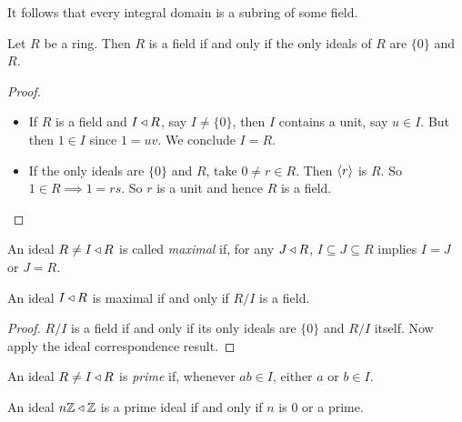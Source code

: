 \documentclass{../template/note}
\begin{document}
    
    \begin{remark*}
        It follows that every integral domain is a subring of some field.
    \end{remark*}


    \begin{proposition}
        Let $R$ be a ring. Then $R$ is a field if and only if the only ideals of $R$ are $\{0\}$ and $R$.
    \end{proposition}
    
    \begin{proof}
        \begin{itemize}
            \item[$\implies$] If $R$ is a field and $I \triangleleft R$, say $I \neq \{0\}$, then $I$ contains a unit, say $u \in I$. But then $1 \in I$ since $1 = uv$. We conclude $I = R$.
            \item[$\impliedby$] If the only ideals are $\{0\}$ and $R$, take $0 \neq r \in R$. Then $\left \langle r \right \rangle$ is $R$. So $1 \in R \implies 1 = rs$. So $r$ is a unit and hence $R$ is a field. 
        \end{itemize}
    \end{proof}
    
    \begin{definition}
        An ideal $R \neq I \triangleleft R$ is called \emph{maximal} if, for any $J \triangleleft R$, $I \subseteq J \subseteq R$ implies $I = J$ or $J = R$.
    \end{definition}
    
    \begin{proposition}
        \label{maximal-field}
        An ideal $I \triangleleft R$ is maximal if and only if $R/I$ is a field.
    \end{proposition}
    
    \begin{proof}
        $R/I$ is a field if and only if its only ideals are $\{0\}$ and $R/I$ itself. Now apply the ideal correspondence result.
    \end{proof}
    
    \begin{definition}
        An ideal $R \neq I \triangleleft R$ is \emph{prime} if, whenever $ab \in I$, either $a$ or $b \in I$.
    \end{definition}
    
    \begin{example}
        An ideal $n\mathbb Z \triangleleft \mathbb Z$ is a prime ideal if and only if $n$ is 0 or a prime.
    \end{example}
    
\end{document}
